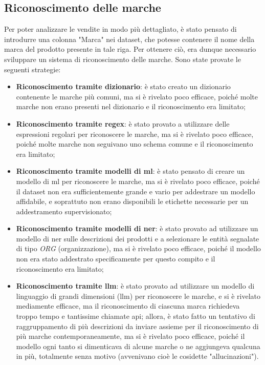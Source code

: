 \subsection{Riconoscimento delle marche}
\label{sec:recognition-brands}

Per poter analizzare le vendite in modo più dettagliato, è stato pensato di introdurre una colonna "Marca" nei dataset, che potesse contenere il nome della marca del prodotto presente in tale riga. Per ottenere ciò, era dunque necessario sviluppare un sistema di riconoscimento delle marche. Sono state provate le seguenti strategie:
\begin{itemize}
    \item \textbf{Riconoscimento tramite dizionario}: è stato creato un dizionario contenente le marche più comuni, ma si è rivelato poco efficace, poiché molte marche non erano presenti nel dizionario e il riconoscimento era limitato;
    \item \textbf{Riconoscimento tramite regex}: è stato provato a utilizzare delle espressioni regolari per riconoscere le marche, ma si è rivelato poco efficace, poiché molte marche non seguivano uno schema comune e il riconoscimento era limitato;
    \item \textbf{Riconoscimento tramite modelli di \gls{ml}\glsfirstoccur{}}: è stato pensato di creare un modello di \gls{ml} per riconoscere le marche, ma si è rivelato poco efficace, poiché il dataset non era sufficientemente grande e vario per addestrare un modello affidabile, e soprattuto non erano disponibili le etichette necessarie per un addestramento supervisionato;
    \item \textbf{Riconoscimento tramite modelli di \gls{ner}\glsfirstoccur{}}: è stato provato ad utilizzare un modello di \gls{ner} sulle descrizioni dei prodotti e a selezionare le entità segnalate di tipo \emph{ORG} (organizzazione), ma si è rivelato poco efficace, poiché il modello non era stato addestrato specificamente per questo compito e il riconoscimento era limitato;
    \item \textbf{Riconoscimento tramite \gls{llm}\glsfirstoccur{}}: è stato provato ad utilizzare un modello di linguaggio di grandi dimensioni (\gls{llm}) per riconoscere le marche, e si è rivelato mediamente efficace, ma il riconoscimento di ciascuna marca richiedeva troppo tempo e tantissime chiamate \gls{api}\glsfirstoccur{}; allora, è stato fatto un tentativo di raggruppamento di più descrizioni da inviare assieme per il riconoscimento di più marche contemporaneamente, ma si è rivelato poco efficace, poiché il modello ogni tanto si dimenticava di alcune marche o ne aggiungeva qualcuna in più, totalmente senza motivo (avvenivano cioè le cosidette "allucinazioni").
\end{itemize}

